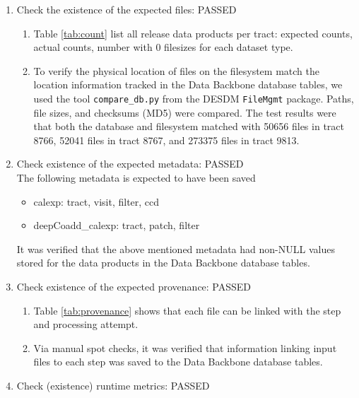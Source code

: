 \documentclass[DM,lsstdraft,STR,toc]{lsstdoc}
\begin{document}
\begin{enumerate}

  \item{Check the existence of the expected files: PASSED}

  \begin{enumerate}

    \item{
      Table \ref{tab:count} list all release data products per tract:  expected counts, actual counts, number with 0 filesizes for each dataset type.}

    \item{
      To verify the physical location of files on the filesystem match the location information tracked in the Data Backbone database tables, we used the tool
	  \texttt{compare{\_}db.py} from the DESDM \texttt{FileMgmt} package.
      Paths, file sizes, and checksums (MD5) were compared.
      The test results were that both the database and filesystem matched with 50656 files in tract 8766, 52041 files in tract 8767, and 273375 files in tract 9813.
    }
  \end{enumerate}

  \item{
    Check existence of the expected metadata: PASSED\\
    The following metadata is expected to have been saved

    \begin{itemize}
      \item{calexp: tract, visit, filter, ccd}
      \item{deepCoadd\_calexp: tract, patch, filter}
    \end{itemize}

    It was verified that the above mentioned metadata had non-NULL values stored for the data products in the Data Backbone database tables.
  }

  \item{
    Check existence of the expected provenance: PASSED

    \begin{enumerate}
      \item{Table \ref{tab:provenance} shows that each file can be linked with the step and processing attempt.}
      \item{Via manual spot checks, it was verified that information linking input files to each step was saved to the Data Backbone database tables.}
    \end{enumerate}
  }

  \item{Check (existence) runtime metrics: PASSED

  }
\end{enumerate}
\end{document}
